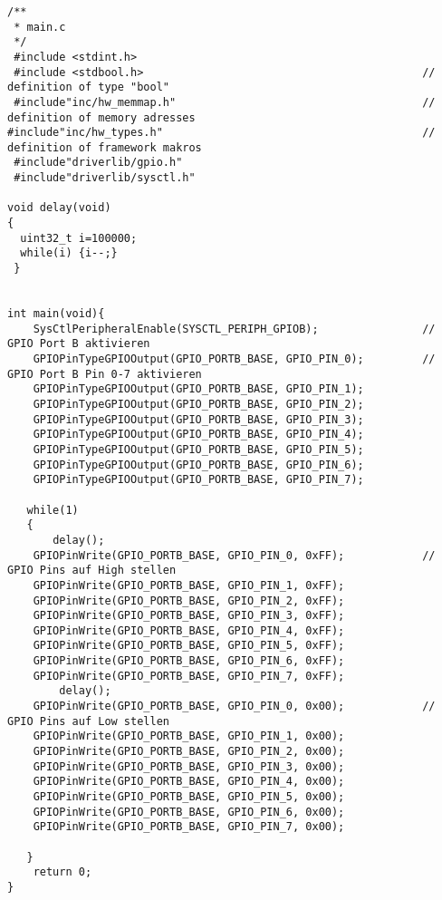 \subsubsection{}
\begin{lstlisting}
/**
 * main.c
 */
 #include <stdint.h>
 #include <stdbool.h>                                           // definition of type "bool"
 #include"inc/hw_memmap.h"                                      // definition of memory adresses
#include"inc/hw_types.h"                                        // definition of framework makros
 #include"driverlib/gpio.h"
 #include"driverlib/sysctl.h"

void delay(void)
{
  uint32_t i=100000;
  while(i) {i--;}
 }


int main(void){
    SysCtlPeripheralEnable(SYSCTL_PERIPH_GPIOB);                // GPIO Port B aktivieren
    GPIOPinTypeGPIOOutput(GPIO_PORTB_BASE, GPIO_PIN_0);         // GPIO Port B Pin 0-7 aktivieren
    GPIOPinTypeGPIOOutput(GPIO_PORTB_BASE, GPIO_PIN_1);
    GPIOPinTypeGPIOOutput(GPIO_PORTB_BASE, GPIO_PIN_2);
    GPIOPinTypeGPIOOutput(GPIO_PORTB_BASE, GPIO_PIN_3);
    GPIOPinTypeGPIOOutput(GPIO_PORTB_BASE, GPIO_PIN_4);
    GPIOPinTypeGPIOOutput(GPIO_PORTB_BASE, GPIO_PIN_5);
    GPIOPinTypeGPIOOutput(GPIO_PORTB_BASE, GPIO_PIN_6);
    GPIOPinTypeGPIOOutput(GPIO_PORTB_BASE, GPIO_PIN_7);

   while(1)
   {
       delay();
    GPIOPinWrite(GPIO_PORTB_BASE, GPIO_PIN_0, 0xFF);            // GPIO Pins auf High stellen
    GPIOPinWrite(GPIO_PORTB_BASE, GPIO_PIN_1, 0xFF);
    GPIOPinWrite(GPIO_PORTB_BASE, GPIO_PIN_2, 0xFF);
    GPIOPinWrite(GPIO_PORTB_BASE, GPIO_PIN_3, 0xFF);
    GPIOPinWrite(GPIO_PORTB_BASE, GPIO_PIN_4, 0xFF);
    GPIOPinWrite(GPIO_PORTB_BASE, GPIO_PIN_5, 0xFF);
    GPIOPinWrite(GPIO_PORTB_BASE, GPIO_PIN_6, 0xFF);
    GPIOPinWrite(GPIO_PORTB_BASE, GPIO_PIN_7, 0xFF);
        delay();
    GPIOPinWrite(GPIO_PORTB_BASE, GPIO_PIN_0, 0x00);            // GPIO Pins auf Low stellen
    GPIOPinWrite(GPIO_PORTB_BASE, GPIO_PIN_1, 0x00);
    GPIOPinWrite(GPIO_PORTB_BASE, GPIO_PIN_2, 0x00);
    GPIOPinWrite(GPIO_PORTB_BASE, GPIO_PIN_3, 0x00);
    GPIOPinWrite(GPIO_PORTB_BASE, GPIO_PIN_4, 0x00);
    GPIOPinWrite(GPIO_PORTB_BASE, GPIO_PIN_5, 0x00);
    GPIOPinWrite(GPIO_PORTB_BASE, GPIO_PIN_6, 0x00);
    GPIOPinWrite(GPIO_PORTB_BASE, GPIO_PIN_7, 0x00);

   }
    return 0;
}
\end{lstlisting}

\subsubsection{}


